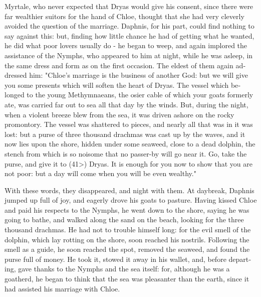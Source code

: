 \documentclass{book}
\begin{document}
\begin{pairs}
\begin{Rightside}
\begin{english}
  Myrtale, who never expected that Dryas would give his consent, since there were far wealthier suitors for the hand of Chloe, thought that she had very cleverly avoided the question of the marriage.  Daphnis, for his part, could find nothing to say against this: but, finding how little chance he had of getting what he wanted, he did what poor lovers usually do - he began to weep, and again implored the assistance of the Nymphs, who appeared to him at night, while he was asleep, in the same dress and form as on the first occasion.  The eldest of them again addressed him: "Chloe's marriage is the business of another God: but we will give you some presents which will soften the heart of Dryas.  The vessel which belonged to the young Methymnaeans, the osier cable of which your goats formerly ate, was carried far out to sea all that day by the winds.  But, during the night, when a violent breeze blew from the sea, it was driven ashore on the rocky promontory.  The vessel was shattered to pieces, and nearly all that was in it was lost: but a purse of three thousand drachmas was cast up by the waves, and it now lies upon the shore, hidden under some seaweed, close to a dead dolphin, the stench from which is so noisome that no passer-by will go near it.  Go, take the purse, and give it to (41>) Dryas.  It is enough for you now to show that you are not poor: but a day will come when you will be even wealthy."
\pend


  With these words, they disappeared, and night with them.  At daybreak, Daphnis jumped up full of joy, and eagerly drove his goats to pasture.  Having kissed Chloe and paid his respects to the Nymphs, he went down to the shore, saying he was going to bathe, and walked along the sand on the beach, looking for the three thousand drachmas.  He had not to trouble himself long: for the evil smell of the dolphin, which lay rotting on the shore, soon reached his nostrils.  Following the smell as a guide, he soon reached the spot, removed the seaweed, and found the purse full of money.  He took it, stowed it away in his wallet, and, before departing, gave thanks to the Nymphs and the sea itself: for, although he was a goatherd, he began to think that the sea was pleasanter than the earth, since it had assisted his marriage with Chloe.
\pend



\end{english}
\end{Rightside}
\end{pairs}
\end{document}
